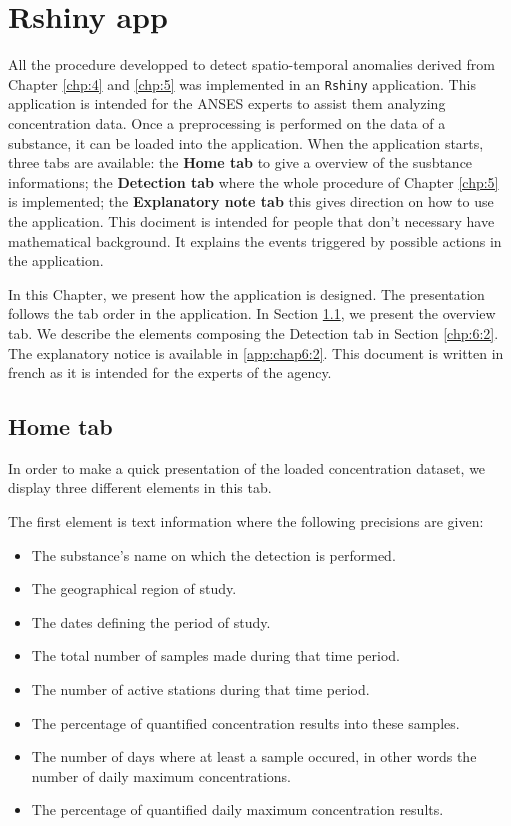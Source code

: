 \chapter{Rshiny app}\label{chp:6}

\minitoc

\clearpage

All the procedure developped to detect spatio-temporal anomalies derived from Chapter \ref{chp:4} and \ref{chp:5} was implemented in an \texttt{Rshiny} application. This application is intended for the ANSES experts to assist them analyzing concentration data. 
Once a preprocessing is performed on the data of a substance, it can be loaded into the application. When the application starts, three tabs are available: the \textbf{Home tab} to give a overview of the susbtance informations; the \textbf{Detection tab} where the whole procedure of Chapter \ref{chp:5} is implemented; the \textbf{Explanatory note tab} this gives direction on how to use the application. This dociment is intended for people that don't necessary have mathematical background. It explains the events triggered by possible actions in the application.     

In this Chapter, we present how the application is designed. The presentation follows the tab order in the application. In Section \ref{chp:6:1}, we present the overview tab. We describe the elements composing the Detection tab in Section \ref{chp:6:2}. The explanatory notice is available in \ref{app:chap6:2}. This document is written in french as it is intended for the experts of the agency.  

\section{Home tab}\label{chp:6:1}

In order to make a quick presentation of the loaded concentration dataset, we display three different elements in this tab.  
  
The first element is text information where the following precisions are given: 
\begin{itemize}
\item The substance's name on which the detection is performed.
\item The geographical region of study.
\item The dates defining the period of study.
\item The total number of samples made during that time period.
\item The number of active stations during that time period.
\item The percentage of quantified concentration results into these samples. 
\item The number of days where at least a sample occured, in other words the number of daily maximum concentrations. 
\item The percentage of quantified daily maximum concentration results.
\end{itemize}

